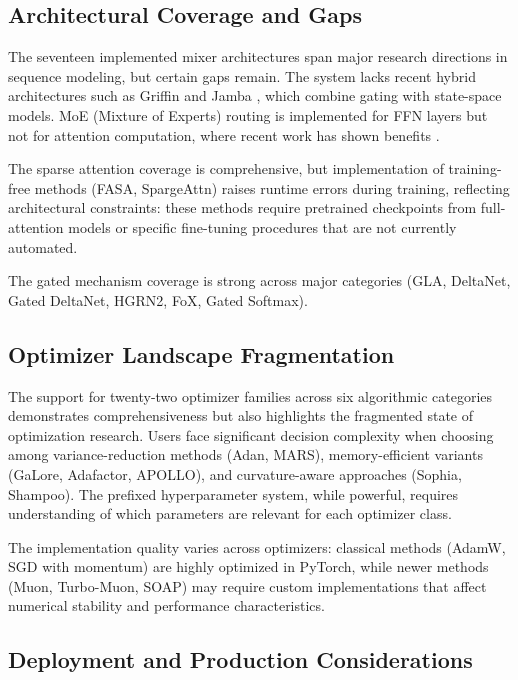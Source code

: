 \documentclass[11pt,a4paper]{article}
\begin{document}
\subsection{Architectural Coverage and Gaps}

The seventeen implemented mixer architectures span major research directions in sequence modeling, but certain gaps remain. The system lacks recent hybrid architectures such as Griffin \citep{soares_griffin_2024} and Jamba \citep{gu_jamba_2024}, which combine gating with state-space models. MoE (Mixture of Experts) routing is implemented for FFN layers but not for attention computation, where recent work has shown benefits \citep{lewis_moe_2021}.

The sparse attention coverage is comprehensive, but implementation of training-free methods (FASA, SpargeAttn) raises runtime errors during training, reflecting architectural constraints: these methods require pretrained checkpoints from full-attention models or specific fine-tuning procedures that are not currently automated.

The gated mechanism coverage is strong across major categories (GLA, DeltaNet, Gated DeltaNet, HGRN2, FoX, Gated Softmax).

\subsection{Optimizer Landscape Fragmentation}

The support for twenty-two optimizer families across six algorithmic categories demonstrates comprehensiveness but also highlights the fragmented state of optimization research. Users face significant decision complexity when choosing among variance-reduction methods (Adan, MARS), memory-efficient variants (GaLore, Adafactor, APOLLO), and curvature-aware approaches (Sophia, Shampoo). The prefixed hyperparameter system, while powerful, requires understanding of which parameters are relevant for each optimizer class.

The implementation quality varies across optimizers: classical methods (AdamW, SGD with momentum) are highly optimized in PyTorch, while newer methods (Muon, Turbo-Muon, SOAP) may require custom implementations that affect numerical stability and performance characteristics.

\subsection{Deployment and Production Considerations}
\end{document}
